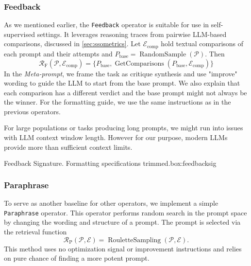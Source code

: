 \subsubsection{Feedback}
As we mentioned earlier, the \texttt{Feedback} operator is suitable for use in self-supervised settings.
It leverages reasoning traces from pairwise LLM-based comparisons, discussed in \ref{sec:ssometrics}. 
Let $\mathcal{E}_{\text{comp}}$ hold textual comparisons of each prompt and their attempts and
$P_{\text{base}} = \operatorname{RandomSample}(\mathcal{P})$. Then
\begin{equation}
    \mathcal{R}_{\text{F}}(\mathcal{P}, \mathcal{E}_{\text{comp}}) = \{P_{\text{base}}, \operatorname{GetComparisons}(P_{\text{base}}, \mathcal{E}_{\text{comp}})\}
\end{equation}
In the \textit{Meta-prompt}, we frame the task as critique synthesis and use "improve" wording to guide the LLM to start from the base prompt.
We also explain that each comparison has a different verdict and the base prompt might not always be the winner. For the formatting guide, we use the same instructions
as in the previous operators.

For large populations or tasks producing long prompts, we might run into issues with LLM context window length. 
However for our purpose, modern LLMs provide more than sufficient context limits. 
\begin{figurebox}{Feedback Signature. Formatting specifications trimmed.}{box:feedbacksig}
\end{figurebox}

\subsubsection{Paraphrase}
To serve as another baseline for other operators, we implement a simple \texttt{Paraphrase} operator.
This operator performs random search in the prompt space by changing the wording and structure of a prompt.
The prompt is selected via the retrieval function
\begin{equation}
    \mathcal{R}_{\text{P}}(\mathcal{P}, \mathcal{E}) = \operatorname{RouletteSampling}(\mathcal{P}, \mathcal{E}).
\end{equation}
This method uses no optimization signal or improvement instructions and relies on pure chance of finding a more potent prompt.


